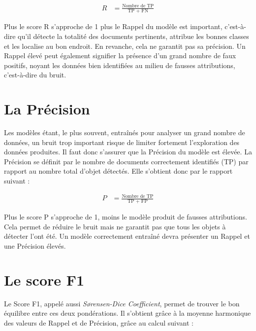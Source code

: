 \documentclass[12pt,twoside]{book}
\begin{document}
\begin{center}
\begin{align*}
    R &= \frac{\text{Nombre de TP}}{\text{TP + FN}}
\end{align*}
\end{center}

Plus le score R s’approche de 1 plus le Rappel du modèle est important, c’est-à-dire qu’il détecte la totalité des documents pertinents, attribue les bonnes classes et les localise au bon endroit. En revanche, cela ne garantit pas sa précision. Un Rappel élevé peut également signifier la présence d’un grand nombre de faux positifs, noyant les données bien identifiées au milieu de fausses attributions, c’est-à-dire du bruit. 


\section[La Précision]{La Précision}

Les modèles étant, le plus souvent, entraînés pour analyser un grand nombre de données, un bruit trop important risque de limiter fortement l’exploration des données produites. Il faut donc s’assurer que la Précision du modèle est élevée. La Précision se définit par le nombre de documents correctement identifiés (TP) par rapport au nombre total d’objet détectés. Elle s’obtient donc par le rapport suivant :

\begin{center}
    \begin{align*}
    P &= \frac{\text{Nombre de TP}}{\text{TP + FP}}
    \end{align*}
\end{center}

Plus le score P s’approche de 1, moins le modèle produit de fausses attributions. Cela permet de réduire le bruit mais ne garantit pas que tous les objets à détecter l’ont été. Un modèle correctement entraîné devra présenter un Rappel et une Précision élevés. 

\newpage
\section[Le score F1]{Le score F1}

Le Score F1, appelé aussi \textit{Sørensen-Dice Coefficient}, permet de trouver le bon équilibre entre ces deux pondérations. Il s’obtient grâce à la moyenne harmonique des valeurs de Rappel et de Précision, grâce au calcul suivant :
\end{document}

